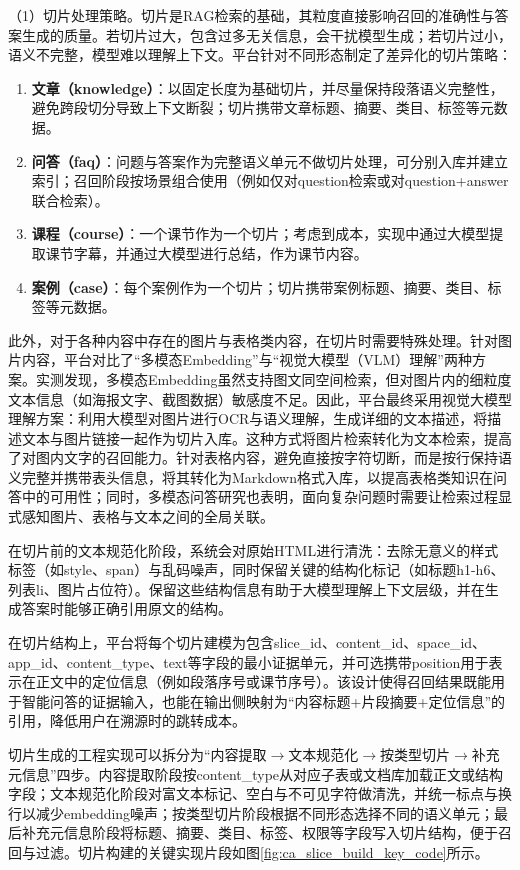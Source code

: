（1）切片处理策略。切片是RAG检索的基础，其粒度直接影响召回的准确性与答案生成的质量。若切片过大，包含过多无关信息，会干扰模型生成；若切片过小，语义不完整，模型难以理解上下文。平台针对不同形态制定了差异化的切片策略：
\begin{enumerate}
\item \textbf{文章（knowledge）}：以固定长度为基础切片，并尽量保持段落语义完整性，避免跨段切分导致上下文断裂；切片携带文章标题、摘要、类目、标签等元数据。
\item \textbf{问答（faq）}：问题与答案作为完整语义单元不做切片处理，可分别入库并建立索引；召回阶段按场景组合使用（例如仅对question检索或对question+answer联合检索）。
\item \textbf{课程（course）}：一个课节作为一个切片；考虑到成本，实现中通过大模型提取课节字幕，并通过大模型进行总结，作为课节内容。
\item \textbf{案例（case）}：每个案例作为一个切片；切片携带案例标题、摘要、类目、标签等元数据。
\end{enumerate}

此外，对于各种内容中存在的图片与表格类内容，在切片时需要特殊处理。针对图片内容，平台对比了“多模态Embedding”与“视觉大模型（VLM）理解”两种方案。实测发现，多模态Embedding虽然支持图文同空间检索，但对图片内的细粒度文本信息（如海报文字、截图数据）敏感度不足。因此，平台最终采用视觉大模型理解方案：利用大模型对图片进行OCR与语义理解，生成详细的文本描述，将描述文本与图片链接一起作为切片入库。这种方式将图片检索转化为文本检索，提高了对图内文字的召回能力。针对表格内容，避免直接按字符切断，而是按行保持语义完整并携带表头信息，将其转化为Markdown格式入库，以提高表格类知识在问答中的可用性；同时，多模态问答研究也表明，面向复杂问题时需要让检索过程显式感知图片、表格与文本之间的全局关联\cite{ke2025large,yu2025mind,shen2025global}。

在切片前的文本规范化阶段，系统会对原始HTML进行清洗：去除无意义的样式标签（如style、span）与乱码噪声，同时保留关键的结构化标记（如标题h1-h6、列表li、图片占位符）。保留这些结构信息有助于大模型理解上下文层级，并在生成答案时能够正确引用原文的结构。

在切片结构上，平台将每个切片建模为包含slice\_id、content\_id、space\_id、app\_id、content\_type、text等字段的最小证据单元，并可选携带position用于表示在正文中的定位信息（例如段落序号或课节序号）。该设计使得召回结果既能用于智能问答的证据输入，也能在输出侧映射为“内容标题+片段摘要+定位信息”的引用，降低用户在溯源时的跳转成本。

切片生成的工程实现可以拆分为“内容提取$\rightarrow$文本规范化$\rightarrow$按类型切片$\rightarrow$补充元信息”四步。内容提取阶段按content\_type从对应子表或文档库加载正文或结构字段；文本规范化阶段对富文本标记、空白与不可见字符做清洗，并统一标点与换行以减少embedding噪声；按类型切片阶段根据不同形态选择不同的语义单元；最后补充元信息阶段将标题、摘要、类目、标签、权限等字段写入切片结构，便于召回与过滤。切片构建的关键实现片段如图\ref{fig:ca_slice_build_key_code}所示。

